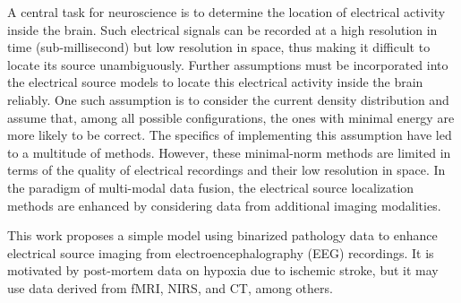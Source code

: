 A central task for neuroscience is to determine the location of electrical activity inside the brain. Such electrical signals can be recorded at a high resolution in time (sub-millisecond) but low resolution in space, thus making it difficult to locate its source unambiguously. Further assumptions must be incorporated into the electrical source models to locate this electrical activity inside the brain reliably. One such assumption is to consider the current density distribution and assume that, among all possible configurations, the ones with minimal energy are more likely to be correct. The specifics of implementing this assumption have led to a multitude of methods. However, these minimal-norm methods are limited in terms of the quality of electrical recordings and their low resolution in space. In the paradigm of multi-modal data fusion, the electrical source localization methods are enhanced by considering data from additional imaging modalities. 

This work proposes a simple model using binarized pathology data to enhance electrical source imaging from electroencephalography (EEG) recordings. It is motivated by post-mortem data on hypoxia due to ischemic stroke, but it may use data derived from fMRI, NIRS, and CT, among others.